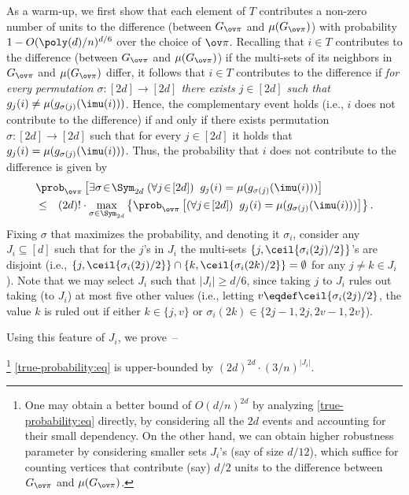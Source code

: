As a warm-up, we first show that each element of $T$
contributes a non-zero number of units to the difference
(between $G_{\ov\pi}$ and $\mu(G_{\ov\pi})$)
with probability $1-O(\poly(d)/n)^{d/6}$ over the choice of $\ov\pi$.
%
%
%
%
%
%
%
%
Recalling that $i\in T$ contributes to the difference
(between $G_{\ov\pi}$ and $\mu(G_{\ov\pi})$)
if the multi-sets of its neighbors in $G_{\ov\pi}$
and $\mu(G_{\ov\pi})$ differ,
it follows that $i\in T$ contributes to the difference if
{\em for every permutation $\sigma:[2d]\to[2d]$
there exists $j\in[2d]$
such that $g_j(i)\neq\mu(g_{\sigma(j)}(\imu(i)))$}.
%
%
%
%
Hence, the complementary event holds
(i.e., $i$ does not contribute to the difference)
if and only if there exists permutation $\sigma:[2d]\to[2d]$
such that for every $j\in[2d]$
it holds that $g_j(i)=\mu(g_{\sigma(j)}(\imu(i)))$.
%
%
%
%
%
%
%
Thus, the probability that $i$ does not contribute to the difference
is given by
\begin{eqnarray}
\lefteqn{\prob_{\ov\pi}
  \left[\exists\sigma\!\in\!\Sym_{2d}\;
        (\forall j\!\in\![2d])\;\;g_j(i)=\mu(g_{\sigma(j)}(\imu(i)))\right]}
\nonumber \\
&\leq& (2d)!\cdot\max_{\sigma\in\Sym_{2d}}
  \left\{\prob_{\ov\pi}\left[(\forall j\!\in\![2d])\;\;
            g_j(i)=\mu(g_{\sigma(j)}(\imu(i)))\right] \right\}.
\label{true-probability:eq}
\end{eqnarray}
Fixing $\sigma$ that maximizes the probability,
and denoting it $\sigma_i$,
%
%
consider any $J_i\subseteq[d]$ such that for the $j$'s in $J_i$
the multi-sets $\{j,\ceil{\sigma_i(2j)/2}\}$'s are disjoint
(i.e., $\{j,\ceil{\sigma_i(2j)/2}\}\cap\{k,\ceil{\sigma_i(2k)/2}\}=\emptyset$
for any $j\neq k\in J_i$).
Note that we may select $J_i$ such that $|J_i|\geq d/6$,
since taking $j$ to $J_i$ rules out taking (to $J_i$)
at most five other values (i.e., letting $v\eqdef\ceil{\sigma_i(2j)/2}$,
the value $k$ is ruled out if either $k\in\{j,v\}$
or $\sigma_i(2k)\in\{2j-1,2j,2v-1,2v\}$).
%
%
%
%
%
%
%
%















Using this feature of $J_i$, we prove~--

\setcounter{subsection}{1}

\footnote{One may obtain a better bound
of $O(d/n)^{2d}$ by analyzing \eqref{true-probability:eq} directly,
by considering all the $2d$ events and accounting for their small dependency.
On the other hand, we can obtain higher robustness parameter
by considering smaller sets $J_i$'s (say of size $d/12$),
which suffice for counting vertices that
contribute (say) $d/2$ units to the difference
between $G_{\ov\pi}$ and $\mu(G_{\ov\pi})$.\label{random-bd:fn}}
%
%
%
\label{random-works-warm-up:clm}
\eqref{true-probability:eq} is upper-bounded
by $(2d)^{2d}\cdot(3/n)^{|J_i|}$.
\Ecm

